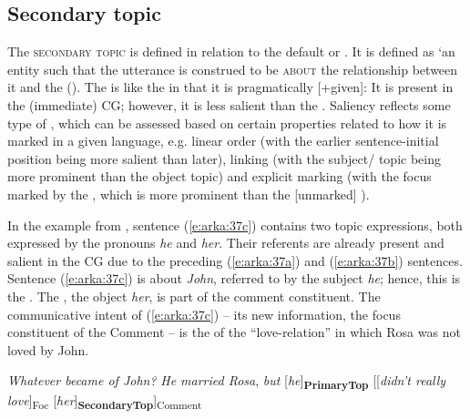 \documentclass[output=paper
,modfonts
,nonflat]{langsci/langscibook}
\begin{document}
\subsection{\label{s5.4}Secondary topic}

The \textsc{secondary topic} is defined in relation to the default or . It is defined as ‘an entity such that the utterance is construed to be \textsc{about} the relationship between it and the  (\citealt[55]{Dalrymple2014}). The  is like the  in that it is pragmatically [+given]: It is present in the (immediate) CG; however, it is less salient than the . Saliency reflects some type of , which can be assessed based on certain properties related to how it is marked in a given language, e.g. linear order (with the earlier sentence-initial position being more salient than later), linking (with the subject/ topic being more prominent than the object topic) and explicit marking (with the focus marked by the  , which is more prominent than the [unmarked] ). 

In the  example from \citet[148]{Lambrecht1994}, sentence (\ref{e:arka:37c}) contains two topic expressions, both expressed by the pronouns \textit{he} and \textit{her}. Their referents are already present and salient in the CG due to the preceding (\ref{e:arka:37a}) and (\ref{e:arka:37b}) sentences. Sentence (\ref{e:arka:37c}) is about \textit{John}, referred to by the subject \textit{he}; hence, this is the . The , the object \textit{her}, is part of the comment constituent. The communicative intent of (\ref{e:arka:37c}) – its new information, the focus constituent of the Comment – is the  of the “love-relation” in which Rosa was not loved by John. 

\begin{exe}
	\ex\label{e:arka:37}
	\begin{xlist}
	\label{e:arka:37a} \textit{Whatever became of John?}
	\label{e:arka:37b} \textit{He married Rosa},
	\label{e:arka:37c} \textit{but} [\textit{he}]\textbf{\textsubscript{PrimaryTop}}\textsubscript{}  [[\textit{didn’t really love}]\textsubscript{Foc} [\textit{her}]\textbf{\textsubscript{SecondaryTop}}]\textsubscript{Comment} 
	\end{xlist}
\end{exe}
\end{document}
